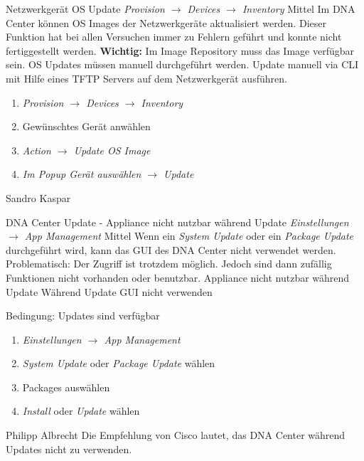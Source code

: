 \bugreport
{Netzwerkgerät OS Update}
{\textit{Provision $\rightarrow$ Devices $\rightarrow$ Inventory}}
{Mittel}
{Im DNA Center können OS Images der Netzwerkgeräte aktualisiert werden. Dieser Funktion hat bei allen Versuchen immer zu Fehlern geführt und konnte nicht fertiggestellt werden.
\textbf{Wichtig:}
Im Image Repository muss das Image verfügbar sein.}
{OS Updates müssen manuell durchgeführt werden.}
{Update manuell via CLI mit Hilfe eines TFTP Servers auf dem Netzwerkgerät ausführen.}
{
	\begin{enumerate}
		\item \textit{Provision $\rightarrow$ Devices $\rightarrow$ Inventory}
		\item Gewünschtes Gerät anwählen 
		\item \textit{Action $\rightarrow$ Update OS Image}
		\item \textit{Im Popup Gerät auswählen $\rightarrow$ Update}
	\end{enumerate}
}
{Sandro Kaspar}
{}

\bugreport
{DNA Center Update - Appliance nicht nutzbar während Update}
{\textit{Einstellungen $\rightarrow$ App Management}}
{Mittel}
{Wenn ein \textit{System Update} oder ein \textit{Package Update} durchgeführt wird, kann das GUI des DNA Center nicht verwendet werden. Problematisch: Der Zugriff ist trotzdem möglich. Jedoch sind dann zufällig Funktionen nicht vorhanden oder benutzbar.}
{Appliance nicht nutzbar während Update}
{Während Update GUI nicht verwenden}
{
	Bedingung: Updates sind verfügbar
	\begin{enumerate}
		\item \textit{Einstellungen $\rightarrow$ App Management}
		\item \textit{System Update} oder \textit{Package Update} wählen
		\item Packages auswählen
		\item \textit{Install} oder \textit{Update} wählen
	\end{enumerate}
}
{Philipp Albrecht}
{Die Empfehlung von Cisco lautet, das DNA Center während Updates nicht zu verwenden.}


